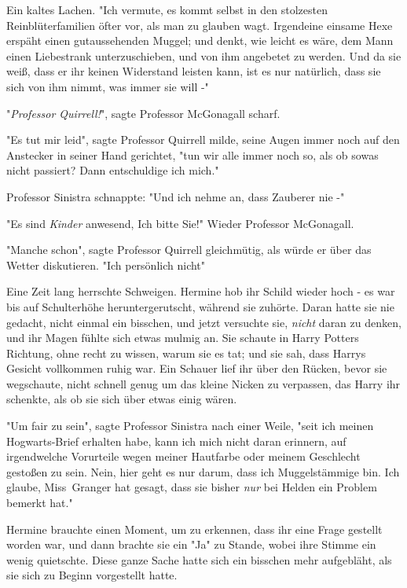 {Ein kaltes Lachen. "Ich vermute, es kommt selbst in den stolzesten Reinblüterfamilien öfter vor, als man zu glauben wagt. Irgendeine einsame Hexe erspäht einen gutaussehenden Muggel; und denkt, wie leicht es wäre, dem Mann einen Liebestrank unterzuschieben, und von ihm angebetet zu werden. Und da sie weiß, dass er ihr keinen Widerstand leisten kann, ist es nur natürlich, dass sie sich von ihm nimmt, was immer sie will -"

"\emph{Professor Quirrell!}", sagte Professor McGonagall scharf.

"Es tut mir leid", sagte Professor Quirrell milde, seine Augen immer noch auf den Anstecker in seiner Hand gerichtet, "tun wir alle immer noch so, als ob sowas nicht passiert? Dann entschuldige ich mich."

Professor Sinistra schnappte: "Und ich nehme an, dass Zauberer nie -"

"Es sind \emph{Kinder} anwesend, Ich bitte Sie!" Wieder Professor McGonagall.

"Manche schon", sagte Professor Quirrell gleichmütig, als würde er über das Wetter diskutieren. "Ich persönlich nicht"

Eine Zeit lang herrschte Schweigen. Hermine hob ihr Schild wieder hoch - es war bis auf Schulterhöhe heruntergerutscht, während sie zuhörte. Daran hatte sie nie gedacht, nicht einmal ein bisschen, und jetzt versuchte sie, \emph{nicht} daran zu denken, und ihr Magen fühlte sich etwas mulmig an. Sie schaute in Harry Potters Richtung, ohne recht zu wissen, warum sie es tat; und sie sah, dass Harrys Gesicht vollkommen ruhig war. Ein Schauer lief ihr über den Rücken, bevor sie wegschaute, nicht schnell genug um das kleine Nicken zu verpassen, das Harry ihr schenkte, als ob sie sich über etwas einig wären.

"Um fair zu sein", sagte Professor Sinistra nach einer Weile, "seit ich meinen Hogwarts-Brief erhalten habe, kann ich mich nicht daran erinnern, auf irgendwelche Vorurteile wegen meiner Hautfarbe oder meinem Geschlecht gestoßen zu sein. Nein, hier geht es nur darum, dass ich Muggelstämmige bin. Ich glaube, Miss~Granger hat gesagt, dass sie bisher \emph{nur} bei Helden ein Problem bemerkt hat."

Hermine brauchte einen Moment, um zu erkennen, dass ihr eine Frage gestellt worden war, und dann brachte sie ein "Ja" zu Stande, wobei ihre Stimme ein wenig quietschte. Diese ganze Sache hatte sich ein bisschen mehr aufgebläht, als sie sich zu Beginn vorgestellt hatte.

}
